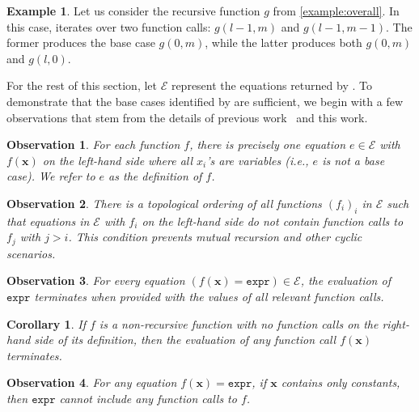 \documentclass[letterpaper]{article} %
\newtheorem{corollary}{Corollary}
\newtheorem{fact}{Observation}
\theoremstyle{remark}
\theoremstyle{definition}
\newtheorem{example}{Example}
\newcommand{\expr}{\mathtt{expr}}
\begin{document}
\begin{example}
  Let us consider the recursive function $g$ from \cref{example:overall}. In
  this case, \FindBaseCases iterates over two function calls: $g(l-1, m)$ and
  $g(l-1, m-1)$. The former produces the base case $g(0, m)$, while the latter
  produces both $g(0, m)$ and $g(l, 0)$.
\end{example}

For the rest of this section, let $\mathcal{E}$ represent the equations returned
by \CompileWithBaseCases. To demonstrate that the base cases identified by
\FindBaseCases are sufficient, we begin with a few observations that stem from
the details of previous
work~\cite{DBLP:conf/ijcai/BroeckTMDR11,DBLP:conf/kr/DilkasB23} and this work.

\begin{fact}\label{assumption1}
  For each function $f$, there is precisely one equation $e \in \mathcal{E}$
  with $f(\mathbf{x})$ on the left-hand side where all $x_{i}$'s are variables
  (i.e., $e$ is not a base case). We refer to $e$ as the \emph{definition} of
  $f$.
\end{fact}

\begin{fact}\label{assumption2}
  There is a \emph{topological ordering} of all functions ${(f_{i})}_{i}$ in
  $\mathcal{E}$ such that equations in $\mathcal{E}$ with $f_{i}$ on the
  left-hand side do not contain function calls to $f_{j}$ with $j > i$. This
  condition prevents mutual recursion and other cyclic scenarios.
\end{fact}

\begin{fact}\label{assumption3}
  For every equation $(f(\mathbf{x}) = \expr) \in \mathcal{E}$, the evaluation
  of $\expr$ terminates when provided with the values of all relevant function
  calls.
\end{fact}

\begin{corollary}\label{fact}
  If $f$ is a non-recursive function with no function calls on the right-hand
  side of its definition, then the evaluation of any function call
  $f(\mathbf{x})$ terminates.
\end{corollary}

\begin{fact}\label{fact2}
  For any equation $f(\mathbf{x}) = \expr{}$, if $\mathbf{x}$ contains only
  constants, then $\expr{}$ cannot include any function calls to $f$.
\end{fact}
\end{document}
